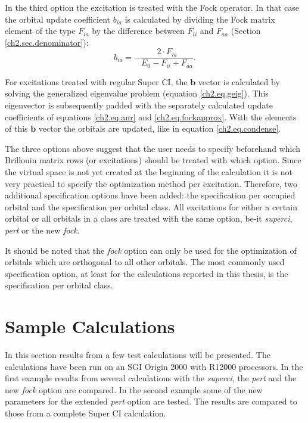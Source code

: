 In the third option the excitation is treated with the Fock operator. In that case the orbital update coefficient $b_{ia}$ is calculated by dividing the Fock matrix element of the type $F_{ia}$ by the difference between $F_{ii}$ and $F_{aa}$ (Section \ref{ch2.sec.denominator}):
\begin{equation}
b_{ia}= - \frac{2 \cdot F_{ia}}{E_0 - F_{ii} + F_{aa}}.
\label{ch2.eq.fockapprox}
\end{equation}

For excitations treated with regular Super CI, the $\mathbf{b}$ vector is calculated by solving the generalized eigenvalue problem (equation \ref{ch2.eq.geig}). This eigenvector is subsequently padded with the separately calculated update coefficients of equations \ref{ch2.eq.anr} and \ref{ch2.eq.fockapprox}. With the elements of this $\mathbf{b}$ vector the orbitals are updated, like in equation \ref{ch2.eq.condense}.

The three options above suggest that the user needs to specify beforehand which Brillouin matrix rows (or excitations) should be treated with which option. Since the virtual space is not yet created at the beginning of the calculation it is not very practical to specify the optimization method per excitation. Therefore, two additional specification options have been added: the specification per occupied orbital and the specification per orbital class. All excitations for either a certain orbital or all orbitals in a class are treated with the same option, be-it \textit{superci}, \textit{pert} or the new \textit{fock}.

It should be noted that the \textit{fock} option can only be used for the optimization of orbitals which are orthogonal to all other orbitals. The most commonly used specification option, at least for the calculations reported in this thesis, is the specification per orbital class. 

\section{Sample Calculations}

In this section results from a few test calculations will be presented. The calculations have been run on an SGI Origin 2000 with R12000 processors. In the first example results from several calculations with the \textit{superci}, the \textit{pert} and the new \textit{fock} option are compared.  In the second example some of the new parameters for the extended \textit{pert} option are tested. The results are compared to those from a complete Super CI calculation.

